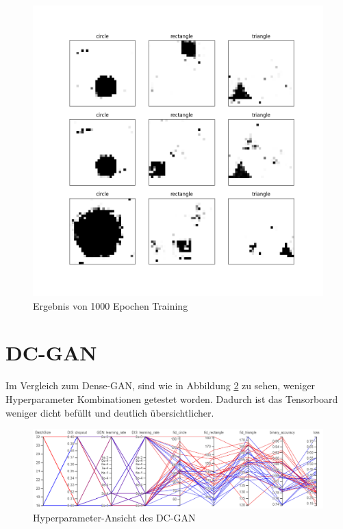 \begin{figure}[H]
	\centering
	\includegraphics[height=0.4\textheight]{kapitel/5_ergebnisse/densegan/good_example_long.png}
	\caption{Ergebnis von 1000 Epochen Training}
	\label{ergebnis:densegan-good-example-long}
\end{figure}

\section{DC-GAN}
Im Vergleich zum Dense-GAN, sind wie in Abbildung \ref{ergebnis:dcgan-hyper} zu sehen, weniger Hyperparameter Kombinationen getestet worden.
Dadurch ist das Tensorboard weniger dicht befüllt und deutlich übersichtlicher.

\begin{figure}[H]
	\centering
	\includegraphics[width=0.75\textheight]{kapitel/5_ergebnisse/dcgan/hyperparameter.PNG}
	\caption{Hyperparameter-Ansicht des DC-GAN}
	\label{ergebnis:dcgan-hyper}
\end{figure}

